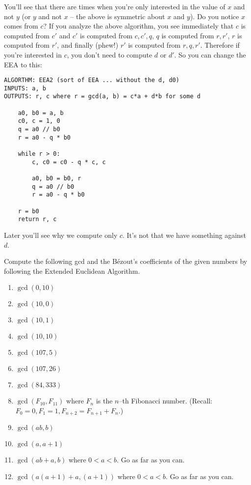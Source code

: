 You'll see that there are times when you're only interested in 
the value of $x$ and not $y$ (or $y$ and not $x$ -- the above is symmetric
about $x$ and $y$).
Do you notice $x$ comes from $c$?
If you analyze the above algorithm, you see immediately that $c$
is computed from $c'$ and $c'$ is computed from $c,c',q$, 
$q$ is computed from $r, r'$, $r$ is computed from $r'$,
and finally (phew!) $r'$ is computed from $r, q, r'$.
Therefore if you're interested in $c$, you don't need to compute $d$ 
or $d'$.
So you can change the EEA to this:

\begin{Verbatim}[frame=single, fontsize=\small]
ALGORTHM: EEA2 (sort of EEA ... without the d, d0)
INPUTS: a, b
OUTPUTS: r, c where r = gcd(a, b) = c*a + d*b for some d

    a0, b0 = a, b
    c0, c = 1, 0
    q = a0 // b0
    r = a0 - q * b0

    while r > 0:   
        c, c0 = c0 - q * c, c
    
        a0, b0 = b0, r
        q = a0 // b0
        r = a0 - q * b0

    r = b0
    return r, c
\end{Verbatim}

Later you'll see why we compute only $c$.
It's not that we have something against $d$.

\newpage
\begin{ex}
  Compute the following gcd and the B\'ezout's coefficients of the
  given numbers by following the Extended Euclidean Algorithm.
  \begin{enumerate}[nosep]
  \item $\gcd(0, 10)$
  \item $\gcd(10, 0)$
  \item $\gcd(10, 1)$
  \item $\gcd(10, 10)$
  \item $\gcd(107, 5)$
  \item $\gcd(107, 26)$
  \item $\gcd(84, 333)$
  \item $\gcd(F_{10}, F_{11})$ where $F_n$ is the $n$--th Fibonacci number.
    (Recall: $F_0 = 0, F_1 = 1, F_{n + 2} = F_{n + 1} + F_n$.)
  \item $\gcd(ab, b)$
  \item $\gcd(a, a + 1)$
  \item $\gcd(ab + a, b)$ where $0 < a < b$. Go as far as you can.
  \item $\gcd(a(a+1) + a, (a+1))$ where $0 < a < b$. Go as far as you can.
  \end{enumerate}
\end{ex}

